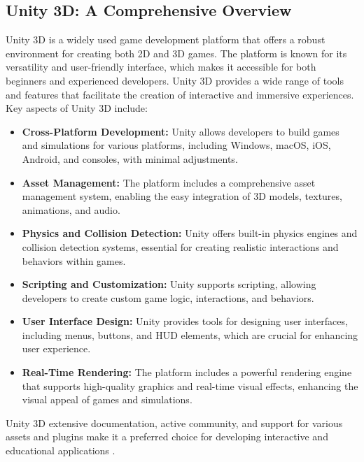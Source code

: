 \subsection*{Unity 3D: A Comprehensive Overview}
Unity 3D is a widely used game development platform that offers a robust environment for creating both 2D and 3D games. The platform is known for its versatility and user-friendly interface, which makes it accessible for both beginners and experienced developers. Unity 3D provides a wide range of tools and features that facilitate the creation of interactive and immersive experiences. Key aspects of Unity 3D include:
\begin{itemize}
    \item \textbf{Cross-Platform Development:} Unity allows developers to build games and simulations for various platforms, including Windows, macOS, iOS, Android, and consoles, with minimal adjustments.
    
    \item \textbf{Asset Management:} The platform includes a comprehensive asset management system, enabling the easy integration of 3D models, textures, animations, and audio.
    
    \item \textbf{Physics and Collision Detection:} Unity offers built-in physics engines and collision detection systems, essential for creating realistic interactions and behaviors within games.
    
    \item \textbf{Scripting and Customization:} Unity supports scripting, allowing developers to create custom game logic, interactions, and behaviors.
    
    \item \textbf{User Interface Design:} Unity provides tools for designing user interfaces, including menus, buttons, and HUD elements, which are crucial for enhancing user experience.
    
    \item \textbf{Real-Time Rendering:} The platform includes a powerful rendering engine that supports high-quality graphics and real-time visual effects, enhancing the visual appeal of games and simulations.
\end{itemize}
Unity 3D extensive documentation, active community, and support for various assets and plugins make it a preferred choice for developing interactive and educational applications \cite{johnson2021unity}.
